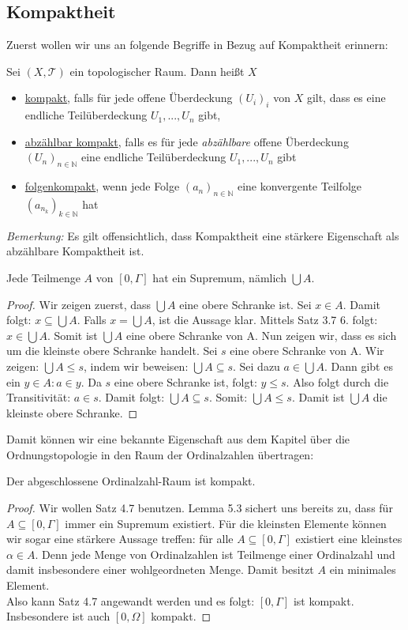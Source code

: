 \documentclass[11pt]{scrartcl}
\begin{document}
\subsection{Kompaktheit}
Zuerst wollen wir uns an folgende Begriffe in Bezug auf Kompaktheit erinnern:
\begin{definition}
	Sei $(X,\mathcal T)$ ein topologischer Raum. Dann heißt $X$
	\begin{itemize}
		\item \underline{kompakt}, falls für jede offene Überdeckung $(U_i)_{i}$ von $X$
			gilt, dass es eine endliche Teilüberdeckung $U_1,...,U_n$ gibt,
		\item \underline{abzählbar kompakt}, falls es für jede \textit{abzählbare} offene 
			Überdeckung $(U_n)_{n\in\mathbb N}$ eine endliche Teilüberdeckung $U_1,...,U_n$
			gibt
		\item \underline{folgenkompakt}, wenn jede Folge $(a_n)_{n\in\mathbb N}$ eine konvergente
			Teilfolge $(a_{n_k})_{k\in\mathbb N}$ hat
	\end{itemize}
\end{definition}
\noindent \textit{Bemerkung:} Es gilt offensichtlich, dass Kompaktheit eine stärkere Eigenschaft als abzählbare Kompaktheit ist.
\begin{lemma}
	Jede Teilmenge $A$ von $[0,\Gamma]$ hat ein Supremum, nämlich $\bigcup A$.
\end{lemma}
\begin{proof}
	Wir zeigen zuerst, dass $\bigcup A$ eine obere Schranke ist.
	Sei $x\in A$. Damit folgt: $ x \subseteq \bigcup A$. Falls $x=\bigcup A$, ist die Aussage klar. Mittels Satz 3.7 6. folgt: $x\in \bigcup A$. Somit ist $\bigcup A$ eine obere Schranke von A.
	Nun zeigen wir, dass es sich um die kleinste obere Schranke handelt. Sei $s$ eine obere Schranke von A.
	Wir zeigen: $\bigcup A\leq s$, indem wir beweisen: $\bigcup A \subseteq s$. Sei dazu $a\in \bigcup A$. 
	Dann gibt es ein $y\in A: a\in y$. Da $s$ eine obere Schranke ist, folgt: $y \leq s$. Also folgt durch
	die Transitivität: $a\in s$. Damit folgt: $\bigcup A \subseteq s$. Somit: $\bigcup A \leq s$.
	Damit ist $\bigcup A$ die kleinste obere Schranke.
\end{proof}
Damit können wir eine bekannte Eigenschaft aus dem Kapitel über die Ordnungstopologie in den Raum der Ordinalzahlen übertragen:
\begin{theorem}
	Der abgeschlossene Ordinalzahl-Raum ist kompakt.
\end{theorem}
\begin{proof}
	Wir wollen Satz 4.7 benutzen. Lemma 5.3 sichert uns bereits zu, dass für $A\subseteq [0,\Gamma]$ immer ein Supremum existiert. Für die kleinsten Elemente können wir sogar eine stärkere Aussage treffen:
für alle $A\subseteq [0,\Gamma]$ existiert eine kleinstes $\alpha \in A$. Denn jede Menge von
Ordinalzahlen ist Teilmenge einer Ordinalzahl und damit insbesondere einer wohlgeordneten Menge. Damit besitzt $A$ ein minimales Element.\\
Also kann Satz 4.7 angewandt werden und es folgt: $[0,\Gamma]$ ist kompakt. Insbesondere ist auch $[0,\Omega]$ kompakt.
\end{proof}
\end{document}
